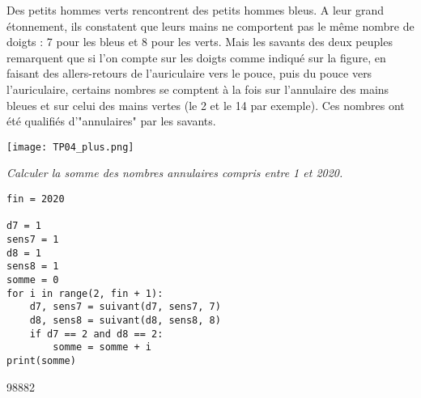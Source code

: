 Des petits hommes verts rencontrent des petits hommes bleus. A leur grand étonnement, ils constatent que leurs mains ne comportent pas le même nombre de doigts : 7 pour les bleus et 8 pour les verts. Mais les savants des deux peuples remarquent que si l'on compte sur les doigts comme indiqué sur la figure, en faisant des allers-retours de l'auriculaire vers le pouce, puis du pouce vers l'auriculaire, certains nombres se comptent à la fois sur l'annulaire des mains bleues et sur celui des mains vertes (le 2 et le 14 par exemple).
Ces nombres ont été qualifiés d'"annulaires" par les savants.
\begin{center}
\texttt{[image: TP04\_plus.png]} 
\end{center}
\begin{Exercise}
\it Calculer la somme des nombres annulaires compris entre 1 et 2020.
\end{Exercise}
\begin{Answer}
\begin{lstlisting}
fin = 2020

d7 = 1
sens7 = 1
d8 = 1
sens8 = 1
somme = 0
for i in range(2, fin + 1):
    d7, sens7 = suivant(d7, sens7, 7)
    d8, sens8 = suivant(d8, sens8, 8)
    if d7 == 2 and d8 == 2:
        somme = somme + i
print(somme)
\end{lstlisting}
98882
\newpage
\end{Answer}
